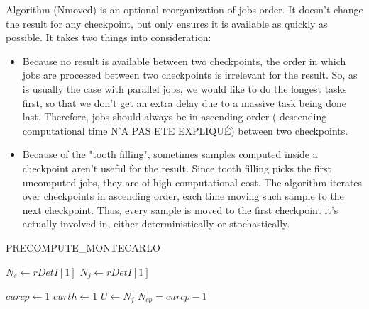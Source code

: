 \documentclass[./thesis.tex]{subfiles}
\begin{document}
Algorithm (Nmoved) is an optional reorganization of jobs order. It doesn't change the result for any checkpoint, but only ensures it is available as quickly as possible. It takes two things into consideration:
\begin{itemize}
\item
Because no result is available between two checkpoints, the order in which jobs are processed between two checkpoints is irrelevant for the result. So, as is usually the case with parallel jobs, we would like to do the longest tasks first, so that we don't get an extra delay due to a massive task being done last. Therefore, jobs should always be in ascending order ( descending computational time N'A PAS ETE EXPLIQUÉ) between two checkpoints.
\item
Because of the "tooth filling", sometimes samples computed inside a checkpoint aren't useful for the result. Since tooth filling picks the first uncomputed jobs, they are of high computational cost. The algorithm iterates over checkpoints in ascending order, each time moving such sample to the next checkpoint. Thus, every sample is moved to the first checkpoint it's actually involved in, either deterministically or stochastically.
\end{itemize}



\begin{algorithm}
	\caption{PRECOMPUTE\_MONTECARLO}
	\label{PRECOMPUTE_MONTECARLO}
	
		$N_s \gets rDetI[1]$ \;
		$N_j \gets rDetI[1]$ \;
		
		$curcp \gets 1$ \;
		$curth \gets 1$ \;
		$U \gets N_j$ \;
		$N_{cp} = curcp - 1$ \;
	
\end{algorithm}
\end{document}
